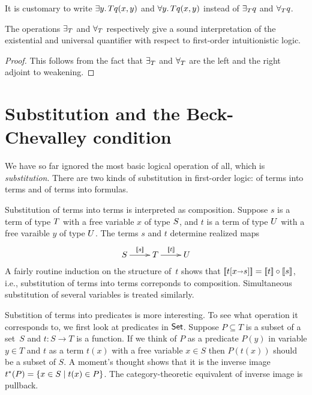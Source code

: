 It is customary to write $\exists y .\,{T}{q(x,y)}$ and
$\forall y .\,{T}{q(x,y)}$ instead of $\exists_{T} q$ and
$\forall_{T} q$.

\begin{proposition}
  The operations $\exists_{T}$ and $\forall_{T}$
  respectively give a sound interpretation of the existential and
  universal quantifier with respect to first-order intuitionistic
  logic.
\end{proposition}

\begin{proof}
  This follows from the fact that $\exists_{T}$ and
  $\forall_{T}$ are the left and the right adjoint to weakening.
\end{proof}

\section{Substitution and the Beck-Chevalley condition}
\label{sec:beck-chevalley}

We have so far ignored the most basic logical operation of all, which
is \emph{substitution}. There are two kinds of substitution in
first-order logic: of terms into terms and of terms into formulas.

Substitution of terms into terms is interpreted as composition.
Suppose $s$ is a term of type $T$ with a free variable $x$ of
type $S$, and $t$ is a term of type $U$ with a free
varaible $y$ of type $U$. The terms $s$ and $t$ determine
realized maps
%
\begin{equation*}
  \xymatrix{
    {\asm{S}}
    \ar[r]^{\sem{s}}
    &
    {\asm{T}}
    \ar[r]^{\sem{t}}
    &
    {\asm{U}}
  }
\end{equation*}
%
A fairly routine induction on the structure of~$t$ shows that
$[\![t[x {\shortrightarrow} s]]\!] = [\![t]\!] \circ [\![s]\!]$, i.e.,
substitution of terms into terms correponds to composition.
Simultaneous substitution of several variables is treated similarly.

Substition of terms into predicates is more interesting. To see what
operation it corresponds to, we first look at predicates in $\mathsf{Set}$.
Suppose $P \subseteq T$ is a subset of a set~$S$ and $t : S \to T$ is
a function. If we think of $P$ as a predicate $P(y)$ in variable $y
\in T$ and $t$ as a term $t(x)$ with a free variable $x \in S$ then
$P(t(x))$ should be a subset of $S$. A moment's thought shows that it
is the inverse image $t^{*}(P) = \{x \in S \mid t(x) \in P\}$.
The category-theoretic equivalent of inverse image is pullback.

